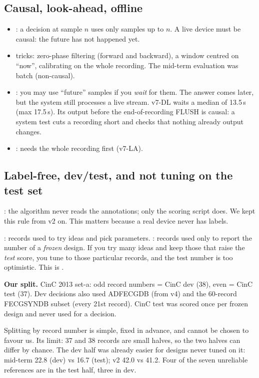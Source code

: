 \documentclass[11pt]{article}
\begin{document}
\subsection{Causal, look-ahead, offline}
\begin{itemize}
  \item {}: a decision at sample $n$ uses only samples up to $n$. A live device must be causal: the future has not happened yet.
  \item {} tricks: zero-phase filtering (forward and backward), a window centred on ``now'', calibrating on the whole recording. The mid-term evaluation was batch (non-causal).
  \item {}: you may use ``future'' samples if you \emph{wait} for them. The answer comes later, but the system still processes a live stream. v7-DL waits a median of 13.5\,s (max 17.5\,s). Its output before the end-of-recording FLUSH is causal: a system test cuts a recording short and checks that nothing already output changes.
  \item {}: needs the whole recording first (v7-LA).
\end{itemize}

\subsection{Label-free, dev/test, and not tuning on the test set}
: the algorithm never reads the annotations; only the scoring script does. We kept this rule from v2 on. This matters because a real device never has labels.

: records used to try ideas and pick parameters. : records used only to report the number of a \emph{frozen} design. If you try many ideas and keep those that raise the \emph{test} score, you tune to those particular records, and the test number is too optimistic. This is .

\textbf{Our split.} CinC 2013 set-a: odd record numbers = CinC dev (38), even = CinC test (37). Dev decisions also used ADFECGDB (from v4) and the 60-record FECGSYNDB subset (every 21st record). CinC test was scored once per frozen design and never used for a decision.

\begin{warn}
Splitting by record number is simple, fixed in advance, and cannot be chosen to favour us. Its limit: 37 and 38 records are small halves, so the two halves can differ by chance. The dev half was already easier for designs never tuned on it: mid-term 22.8 (dev) vs 16.7 (test); v2 42.0 vs 41.2. Four of the seven unreliable references are in the test half, three in dev.
\end{warn}
\end{document}
